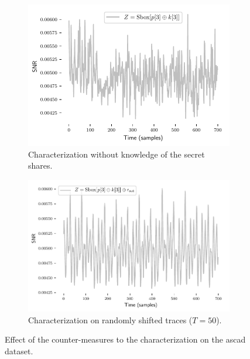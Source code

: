 \begin{figure}
    \centering
    \begin{subfigure}{0.49 \textwidth}
        \includegraphics[width=\textwidth]{ASCAD/snr_raw}
        \caption{Characterization without knowledge of the secret shares.}
        \label{fig:charac_ascad_mask}
    \end{subfigure}
    \begin{subfigure}{0.49 \textwidth}
        \includegraphics[width=\textwidth]{ASCAD/snr_desync50}
        \caption{Characterization on randomly shifted traces (\(T=50\)).}
        \label{fig:charac_ascad_shift}
    \end{subfigure}
    \caption{Effect of the counter-measures to the characterization on the \gls{ascad} dataset.}
    \label{fig:charac_ascad_cm}
\end{figure}

